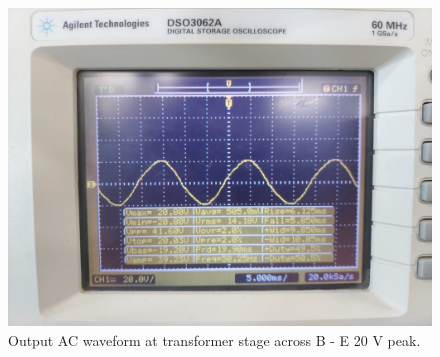 \documentclass[journal,12pt,twocolumn]{IEEEtran}
\begin{document}
	\begin{figure}[!ht]
		\includegraphics[width=\columnwidth]{figs/transformerf.jpg}
		\caption{Output AC waveform at transformer stage across B - E 20 V peak.}
		\label{fig:transformer}
	\end{figure}
	
\end{document}
